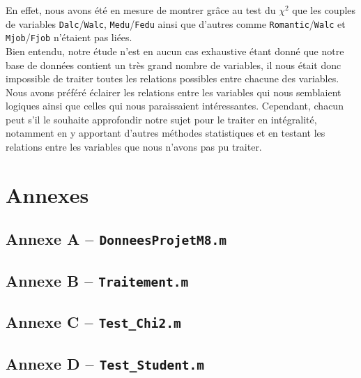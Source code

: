 \documentclass[11pt]{article}
\begin{document}
En effet, nous avons été en mesure de montrer grâce au test du $\chi^2$ que les couples de variables \texttt{Dalc}/\texttt{Walc}, \texttt{Medu}/\texttt{Fedu} ainsi que d'autres comme \texttt{Romantic}/\texttt{Walc} et \texttt{Mjob}/\texttt{Fjob} n'étaient pas liées. ~\\


Bien entendu, notre étude n'est en aucun cas exhaustive étant donné que notre base de données contient un très grand nombre de variables, il nous était donc impossible de traiter toutes les relations possibles entre chacune des variables. Nous avons préféré éclairer les relations entre les variables qui nous semblaient logiques ainsi que celles qui nous paraissaient intéressantes. Cependant, chacun peut s'il le souhaite approfondir notre sujet pour le traiter en intégralité, notamment en y apportant d'autres méthodes statistiques et en testant les relations entre les variables que nous n'avons pas pu traiter.
\newpage
\lstlistoflistings{}\thispagestyle{mine}
\listoftables{}
\listoffigures{}


\newpage
\section*{Annexes}
\subsection*{Annexe A \--- \texttt{DonneesProjetM8.m}} 

\newpage
\subsection*{Annexe B \--- \texttt{Traitement.m}}

\newpage
\subsection*{Annexe C \--- \texttt{Test\_Chi2.m}}

\newpage
\subsection*{Annexe D \--- \texttt{Test\_Student.m}}


\end{document}
